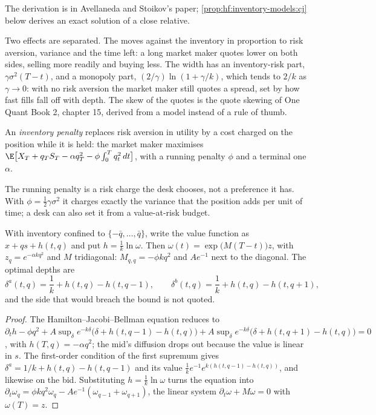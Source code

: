 \admitted
The derivation is in Avellaneda and Stoikov's paper; \cref{prop:hf:inventory-models:cj} below derives an exact solution of a close relative.

Two effects are separated. The  moves against the inventory in proportion to risk aversion, variance and the time left: a long
market maker quotes lower on both sides, selling more readily and buying less. The width has an inventory-risk part, $\gamma\sigma^2(T-t)$, and a
monopoly part, $(2/\gamma)\ln(1+\gamma/k)$, which tends to $2/k$ as $\gamma\to0$: with no risk aversion the market maker still quotes a spread,
set by how fast fills fall off with depth. The skew of the quotes is the quote skewing of One Quant Book 2, chapter 15, derived from a model instead
of a rule of thumb.

\begin{definition}\label{def:hf:inventory-models:penalty}
An \emph{inventory penalty} replaces risk aversion in utility by a cost charged on the position while it is held: the
market maker maximises $\E\bigl[X_T+q_TS_T-\alpha q_T^2-\phi\int_0^Tq_t^2\,dt\bigr]$, with a running penalty $\phi$ and a terminal one $\alpha$.
\end{definition}

The running penalty is a risk charge the desk chooses, not a preference it has. With $\phi=\tfrac12\gamma\sigma^2$ it charges exactly the variance
that the position adds per unit of time; a desk can also set it from a value-at-risk budget.

\begin{proposition}\label{prop:hf:inventory-models:cj}
With inventory confined to $\{-\bar q,\dots,\bar q\}$, write the value function as $x+qs+h(t,q)$ and put $h=\tfrac1k\ln\omega$. Then
$\omega(t)=\exp\bigl(M(T-t)\bigr)z$, with $z_q=e^{-\alpha kq^2}$ and $M$ tridiagonal: $M_{q,q}=-\phi kq^2$ and $Ae^{-1}$ next to the diagonal.
The optimal depths are
\[
\delta^a(t,q)=\frac1k+h(t,q)-h(t,q-1),\qquad \delta^b(t,q)=\frac1k+h(t,q)-h(t,q+1),
\]
and the side that would breach the bound is not quoted.
\end{proposition}

\begin{proof}
The Hamilton--Jacobi--Bellman equation reduces to $\partial_th-\phi q^2+A\sup_{\delta}e^{-k\delta}\bigl(\delta+h(t,q-1)-h(t,q)\bigr)+A\sup_\delta
e^{-k\delta}\bigl(\delta+h(t,q+1)-h(t,q)\bigr)=0$, with $h(T,q)=-\alpha q^2$; the mid's diffusion drops out because the value is linear in $s$. The
first-order condition of the first supremum gives $\delta^a=1/k+h(t,q)-h(t,q-1)$ and its value $\tfrac1ke^{-1}e^{k(h(t,q-1)-h(t,q))}$, and likewise
on the bid. Substituting $h=\tfrac1k\ln\omega$ turns the equation into $\partial_t\omega_q=\phi kq^2\omega_q-Ae^{-1}(\omega_{q-1}+\omega_{q+1})$, the
linear system $\partial_t\omega+M\omega=0$ with $\omega(T)=z$.
\end{proof}

